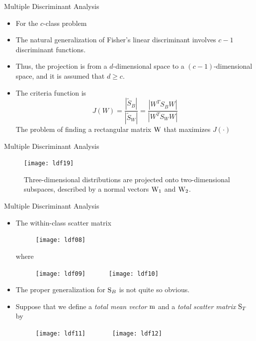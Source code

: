\begin{frame}{Multiple Discriminant Analysis}
\begin{itemize}
\item For the $c$-class problem
\item The natural generalization of Fisher's linear discriminant involves $c-1$ discriminant functions.

\item Thus, the projection is from a $d$-dimensional space to a $(c-1)$-dimensional space, and it is assumed that $d\geq c$.
\item The criteria function is
\[J(W) = \frac{{\left| {{{\tilde S}_B}} \right|}}{{\left| {{{\tilde S}_W}} \right|}} = \frac{{\left| {{W^T}{S_B}W} \right|}}{{\left| {{W^T}{S_W}W} \right|}}\]
The problem of finding a rectangular matrix ${\rm W}$ that maximizes $J(\cdot)$
\end{itemize}
\end{frame}


\begin{frame}{Multiple Discriminant Analysis}
\begin{figure}
\texttt{[image: ldf19]}
\caption{Three-dimensional distributions are projected onto two-dimensional subspaces, described by a normal vectors ${\rm W}_1$ and ${\rm W}_2$.}
\end{figure}
\end{frame}


\begin{frame}{Multiple Discriminant Analysis}
\begin{itemize}
\item The within-class scatter matrix
\begin{figure}
\texttt{[image: ldf08]}
\end{figure}
where\\
\begin{figure}
\texttt{[image: ldf09]}~~~~~~
\texttt{[image: ldf10]}
\end{figure}
\item The proper generalization for ${\rm S}_B$ is not quite so obvious.
\item Suppose that we define a \textit{\color{mycolor2}total mean vector} ${\rm m}$ and a \textit{\color{mycolor2}total scatter matrix} ${\rm S}_T$ by
\begin{figure}
\texttt{[image: ldf11]}~~~~~~~
\texttt{[image: ldf12]}
\end{figure}
\end{itemize}
\end{frame}

